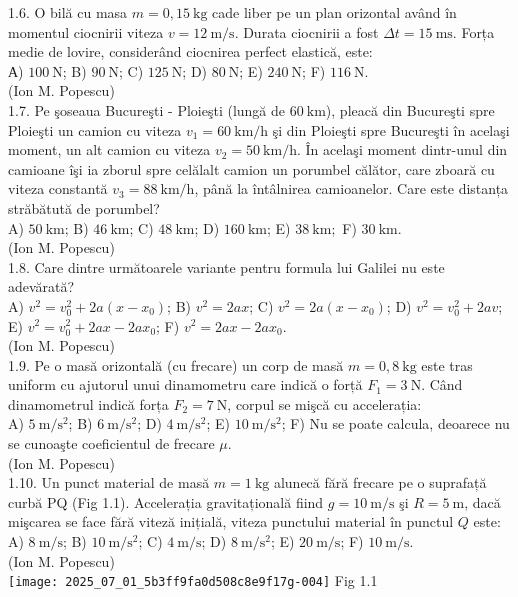 1.6. O bilă cu masa $m=0,15 \mathrm{~kg}$ cade liber pe un plan orizontal având în momentul ciocnirii viteza $v=12 \mathrm{~m} / \mathrm{s}$. Durata ciocnirii a fost $\Delta t=15 \mathrm{~ms}$. Forța medie de lovire, considerând ciocnirea perfect elastică, este:\\ А) $100 \mathrm{~N}$; B) $90 \mathrm{~N}$; C) $125 \mathrm{~N}$; D) $80 \mathrm{~N}$; E) $240 \mathrm{~N}$; F) $116 \mathrm{~N}$.\\ (Ion M. Popescu)\\

1.7. Pe şoseaua Bucureşti - Ploieşti (lungă de $60 \mathrm{~km}$), pleacă din Bucureşti spre Ploieşti un camion cu viteza $v_{1}=60 \mathrm{~km} / \mathrm{h}$ şi din Ploieşti spre Bucureşti în acelaşi moment, un alt camion cu viteza $v_{2}=50 \mathrm{~km} / \mathrm{h}$. În acelaşi moment dintr-unul din camioane îşi ia zborul spre celălalt camion un porumbel călător, care zboară cu viteza constantă $v_{3}=88 \mathrm{~km} / \mathrm{h}$, până la întâlnirea camioanelor. Care este distanța străbătută de porumbel?\\ A) $50 \mathrm{~km}$; B) $46 \mathrm{~km}$; C) $48 \mathrm{~km}$; D) $160 \mathrm{~km}$; E) $38 \mathrm{~km;}$ F) $30 \mathrm{~km}$.\\ (Ion M. Popescu)\\

1.8. Care dintre următoarele variante pentru formula lui Galilei nu este adevărată?\\ A) $v^{2}=v_{0}^{2}+2 a\left(x-x_{0}\right)$; B) $v^{2}=2 a x$; C) $v^{2}=2 a\left(x-x_{0}\right)$; D) $v^{2}=v_{0}^{2}+2 a v$; E) $v^{2}=v_{0}^{2}+2 a x-2 a x_{0}$; F) $v^{2}=2 a x-2 a x_{0}$.\\ (Ion M. Popescu)\\

1.9. Pe o masă orizontală (cu frecare) un corp de masă $m=0,8 \mathrm{~kg}$ este tras uniform cu ajutorul unui dinamometru care indică o forță $F_{1}=3 \mathrm{~N}$. Când dinamometrul indică forța $F_{2}=7 \mathrm{~N}$, corpul se mişcă cu accelerația:\\ A) $5 \mathrm{~m} / \mathrm{s}^{2}$; B) $6 \mathrm{~m} / \mathrm{s}^{2}$; D) $4 \mathrm{~m} / \mathrm{s}^{2}$; E) $10 \mathrm{~m} / \mathrm{s}^{2}$; F) Nu se poate calcula, deoarece nu se cunoaşte coeficientul de frecare $\mu$.\\ (Ion M. Popescu)\\

1.10. Un punct material de masă $m=1 \mathrm{~kg}$ alunecă fără frecare pe o suprafață curbă PQ (Fig 1.1). Accelerația gravitațională fiind $g=10 \mathrm{~m} / \mathrm{s}$ şi $R=5 \mathrm{~m}$, dacă mişcarea se face fără viteză inițială, viteza punctului material în punctul $Q$ este:\\ A) $8 \mathrm{~m} / \mathrm{s}$; B) $10 \mathrm{~m} / \mathrm{s}^{2}$; C) $4 \mathrm{~m} / \mathrm{s}$; D) $8 \mathrm{~m} / \mathrm{s}^{2}$; E) $20 \mathrm{~m} / \mathrm{s}$; F) $10 \mathrm{~m} / \mathrm{s}$.\\ (Ion M. Popescu)\\ \texttt{[image: 2025\_07\_01\_5b3ff9fa0d508c8e9f17g-004]} Fig 1.1\\

